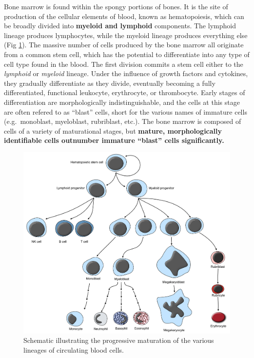 \documentclass[openany]{article}
\begin{document}
Bone marrow is found within the spongy portions of bones. It is the site
of production of the cellular elements of blood, known as hematopoiesis,
which can be broadly divided into \textbf{myeloid and lymphoid}
components. The lymphoid lineage produces lymphocytes, while the myeloid
lineage produces everything else (Fig \ref{fig:bm}). The massive number
of cells produced by the bone marrow all originate from a common stem
cell, which has the potential to differentiate into any type of cell
type found in the blood. The first division commits a stem cell either
to the \emph{lymphoid} or \emph{myeloid} lineage. Under the influence of
growth factors and cytokines, they gradually differentiate as they
divide, eventually becoming a fully differentiated, functional
leukocyte, erythrocyte, or thrombocyte. Early stages of differentiation
are morphologically indistinguishable, and the cells at this stage are
often refered to as ``blast'' cells, short for the various names of
immature cells (e.g.~monoblast, myeloblast, rubriblast, etc.). The bone
marrow is composed of cells of a variety of maturational stages, but
\textbf{mature, morphologically identifiable cells outnumber immature
``blast'' cells significantly.}

\begin{figure}

{\centering \includegraphics[width=1\linewidth]{images/bm} 

}

\caption{Schematic illustrating the progressive maturation of the various lineages of circulating blood cells.}\label{fig:bm}
\end{figure}
\end{document}
